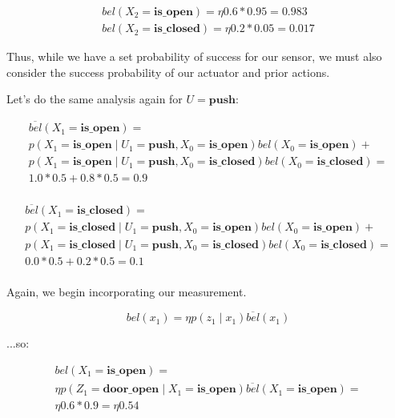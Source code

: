 \documentclass{article}
\begin{document}
\begin{equation}
    \begin{split}
        bel(X_2 = \textbf{is\_open}) = \eta 0.6 * 0.95 = 0.983 \\
        bel(X_2 = \textbf{is\_closed}) = \eta 0.2 * 0.05 = 0.017
    \end{split}
\end{equation}

Thus, while we have a set probability of success for our sensor, we must also consider the success probability of our actuator and prior actions.

Let's do the same analysis again for $U = \textbf{push}$:

\begin{equation}
    \begin{split}
        \overline{bel}(X_1=\textbf{is\_open}) = \\
        p(X_1 = \textbf{is\_open} \mid U_1 = \textbf{push}, X_0 = \textbf{is\_open}) bel(X_0 = \textbf{is\_open}) + \\
        p(X_1 = \textbf{is\_open} \mid U_1 = \textbf{push}, X_0 = \textbf{is\_closed}) bel(X_0 = \textbf{is\_closed}) = \\
        1.0 * 0.5 + 0.8 * 0.5 = 0.9 \\
    \end{split}
\end{equation}

\begin{equation}
    \begin{split}
        \overline{bel}(X_1=\textbf{is\_closed}) = \\
        p(X_1 = \textbf{is\_closed} \mid U_1 = \textbf{push}, X_0 = \textbf{is\_open}) bel(X_0 = \textbf{is\_open}) + \\
        p(X_1 = \textbf{is\_closed} \mid U_1 = \textbf{push}, X_0 = \textbf{is\_closed}) bel(X_0 = \textbf{is\_closed}) = \\
        0.0 * 0.5 + 0.2 * 0.5 = 0.1 \\
    \end{split}
\end{equation}

Again, we begin incorporating our measurement.

\begin{equation}
    bel(x_1) = \eta p(z_1 \mid x_1) \overline{bel}(x_1)
\end{equation}

...so:

\begin{equation}
    \begin{split}
        bel(X_1 = \textbf{is\_open}) = \\
        \eta p(Z_1 = \textbf{door\_open} \mid X_1 = \textbf{is\_open}) \overline{bel}(X_1 = \textbf{is\_open}) = \\
        \eta 0.6 * 0.9 = \eta 0.54
    \end{split}
\end{equation}
\end{document}
